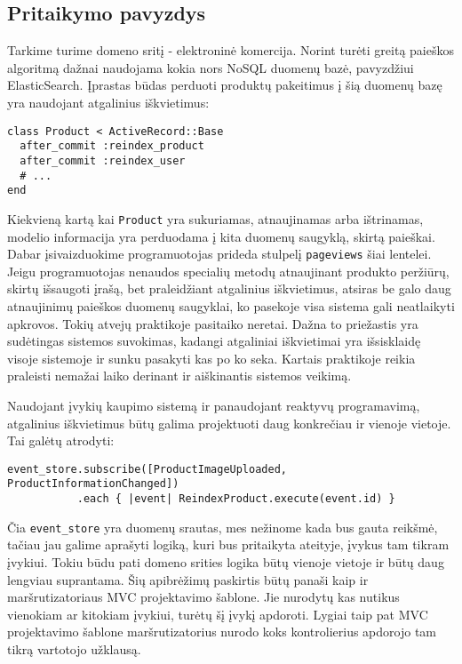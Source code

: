 \subsection{Pritaikymo pavyzdys}

Tarkime turime domeno sritį - elektroninė komercija. Norint turėti greitą paieškos algoritmą dažnai naudojama kokia nors NoSQL duomenų bazė, pavyzdžiui ElasticSearch. Įprastas būdas perduoti produktų pakeitimus į šią duomenų bazę yra naudojant atgalinius iškvietimus:

\begin{lstlisting}[]
class Product < ActiveRecord::Base
  after_commit :reindex_product
  after_commit :reindex_user
  # ...
end
\end{lstlisting}

Kiekvieną kartą kai \lstinline|Product| yra sukuriamas, atnaujinamas arba ištrinamas, modelio informacija yra perduodama į kita duomenų saugyklą, skirtą paieškai. Dabar įsivaizduokime programuotojas prideda stulpelį \lstinline|pageviews| šiai lentelei. Jeigu programuotojas nenaudos specialių metodų atnaujinant produkto peržiūrų, skirtų išsaugoti įrašą, bet praleidžiant atgalinius iškvietimus, atsiras be galo daug atnaujinimų paieškos duomenų saugyklai, ko pasekoje visa sistema gali neatlaikyti apkrovos. Tokių atvejų praktikoje pasitaiko neretai. Dažna to priežastis yra sudėtingas sistemos suvokimas, kadangi atgaliniai iškvietimai yra išsisklaidę visoje sistemoje ir sunku pasakyti kas po ko seka. Kartais praktikoje reikia praleisti nemažai laiko derinant ir aiškinantis sistemos veikimą.

Naudojant įvykių kaupimo sistemą ir panaudojant reaktyvų programavimą, atgalinius iškvietimus būtų galima projektuoti daug konkrečiau ir vienoje vietoje. Tai galėtų atrodyti:

\begin{lstlisting}[]
event_store.subscribe([ProductImageUploaded, ProductInformationChanged])
           .each { |event| ReindexProduct.execute(event.id) }
\end{lstlisting}

Čia \lstinline|event_store| yra duomenų srautas, mes nežinome kada bus gauta reikšmė, tačiau jau galime aprašyti logiką, kuri bus pritaikyta ateityje, įvykus tam tikram įvykiui. Tokiu būdu pati domeno srities logika būtų vienoje vietoje ir būtų daug lengviau suprantama. Šių apibrėžimų paskirtis būtų panaši kaip ir maršrutizatoriaus MVC projektavimo šablone. Jie nurodytų kas nutikus vienokiam ar kitokiam įvykiui, turėtų šį įvykį apdoroti. Lygiai taip pat MVC projektavimo šablone maršrutizatorius nurodo koks kontrolierius apdorojo tam tikrą vartotojo užklausą.

